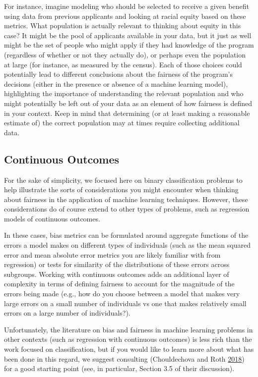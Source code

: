 \documentclass[]{krantz}
\begin{document}
For instance, imagine modeling who should be selected to receive a given
benefit using data from previous applicants and looking at racial equity
based on these metrics. What population is actually relevant to thinking
about equity in this case? It might be the pool of applicants available
in your data, but it just as well might be the set of people who might
apply if they had knowledge of the program (regardless of whether or not
they actually do), or perhaps even the population at large (for
instance, as measured by the census). Each of those choices could
potentially lead to different conclusions about the fairness of the
program's decisions (either in the presence or absence of a machine
learning model), highlighting the importance of understanding the
relevant population and who might potentially be left out of your data
as an element of how fairness is defined in your context. Keep in mind
that determining (or at least making a reasonable estimate of) the
correct population may at times require collecting additional data.

\subsection{Continuous Outcomes}\label{continuous-outcomes}

For the sake of simplicity, we focused here on binary classification
problems to help illustrate the sorts of considerations you might
encounter when thinking about fairness in the application of machine
learning techniques. However, these considerations do of course extend
to other types of problems, such as regression models of continuous
outcomes.

In these cases, bias metrics can be formulated around aggregate
functions of the errors a model makes on different types of individuals
(such as the mean squared error and mean absolute error metrics you are
likely familiar with from regression) or tests for similarity of the
distributions of these errors across subgroups. Working with continuous
outcomes adds an additional layer of complexity in terms of defining
fairness to account for the magnitude of the errors being made (e.g.,
how do you choose between a model that makes very large errors on a
small number of individuals vs one that makes relatively small errors on
a large number of individuals?).

Unfortunately, the literature on bias and fairness in machine learning
problems in other contexts (such as regression with continuous outcomes)
is less rich than the work focused on classification, but if you would
like to learn more about what has been done in this regard, we suggest
consulting (Chouldechova and Roth
\protect\hyperlink{ref-chouldechova2018}{2018}) for a good starting
point (see, in particular, Section 3.5 of their discussion).
\end{document}
